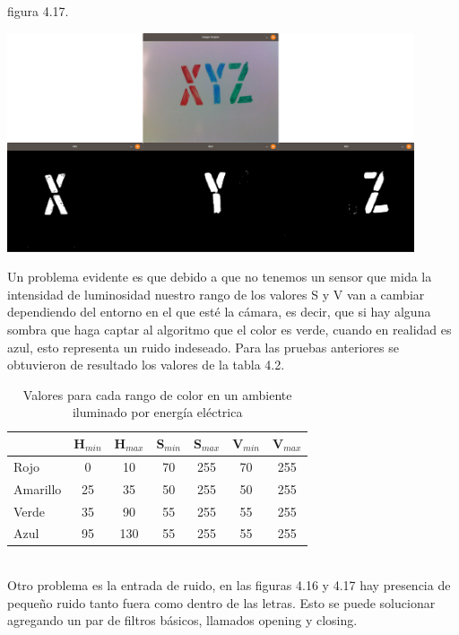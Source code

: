 figura 4.17.
\begin{center}
	\includegraphics[width=0.9\textwidth]{Contenido/Cuerpo/Capitulo4/Fig8.eps}
	\label{Fig9}
\end{center}
Un problema evidente es que debido a que no tenemos un sensor que mida la intensidad de luminosidad
nuestro rango de los valores S y V van a cambiar dependiendo del entorno en el que esté la cámara,
es decir, que si hay alguna sombra que haga captar al algoritmo que el color es verde, cuando en
realidad es azul, esto representa un ruido indeseado.
Para las pruebas anteriores se obtuvieron de resultado los valores de la tabla 4.2.\\
\begin{table}[ht]
	\begin{center}
		\caption{Valores para cada rango de color en un ambiente iluminado por energía eléctrica}
		\begin{tabular}[t]{lcccccc}
			\hline
			         & H$_{min}$ & H$_{max}$ & S$_{min}$ & S$_{max}$ & V$_{min}$ & V$_{max}$ \\
			\hline
			Rojo     & 0         & 10        & 70        & 255       & 70        & 255       \\
			Amarillo & 25        & 35        & 50        & 255       & 50        & 255       \\
			Verde    & 35        & 90        & 55        & 255       & 55        & 255       \\
			Azul     & 95        & 130       & 55        & 255       & 55        & 255       \\
			\hline
		\end{tabular}
	\end{center}
\end{table}\\
Otro problema es la entrada de ruido, en las figuras 4.16 y 4.17
hay presencia de pequeño ruido tanto fuera como dentro de las letras. Esto se puede solucionar
agregando un par de filtros básicos, llamados opening y closing.

